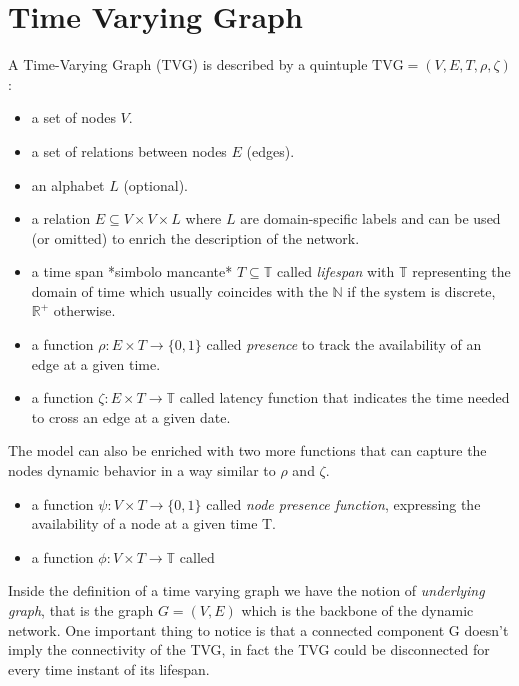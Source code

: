 	\section{Time Varying Graph}

	A Time-Varying Graph (TVG) is described by a quintuple \(\text{TVG} = (V, E, T, \rho, \zeta) \):
	\begin{itemize}
		\item a set of nodes \(V\).
		
		\item a set of relations between nodes \(E\) (edges).	
		
		\item an alphabet \(L\) (optional).
		
		\item a relation \(E \subseteq V \times V \times L\) where \(L\) are domain-specific labels and can be used (or omitted) to enrich the description of the network.
		
		\item a time span *simbolo mancante* \( T \subseteq \mathbb{T}\) called \textit{lifespan} with \(\mathbb{T}\) representing the domain of time which usually coincides with the \(\mathbb{N}\) if the system is discrete, \(\mathbb{R}^+\) otherwise.
		
		\item a function \(\rho : E \times T \to \{0, 1\} \) called \textit{presence} to track the availability of an edge at a given time.
		
		\item a function \(\zeta : E \times T \to \mathbb{T}\) called latency function that indicates the time needed to cross an edge at a given date.
	\end{itemize}

	The model can also be enriched with two more functions that can capture the nodes dynamic behavior in a way similar to \(\rho\) and \(\zeta\).
	\begin{itemize}
		\item a function \(\psi : V \times T \to \{0, 1\}\) called \textit{node presence function}, expressing the availability of a node at a given time T.
		
		\item a function \(\phi : V \times T \to \mathbb{T}\) called 
	\end{itemize}
	
	Inside the definition of a time varying graph we have the notion of \textit{underlying graph}, that is the graph \(G = (V, E)\) which is the backbone of the dynamic network. One important thing to notice is that a connected component G doesn't imply the connectivity of the TVG, in fact the TVG could be disconnected for every time instant of its lifespan.
	
